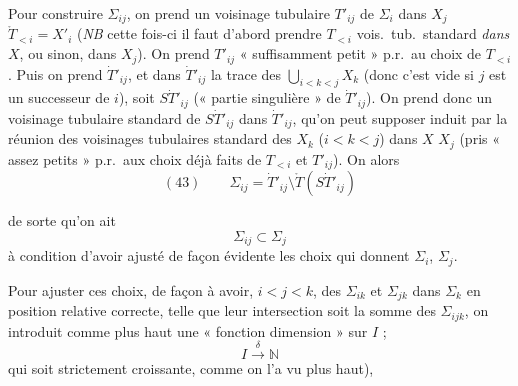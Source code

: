 \documentclass[11pt,a4paper]{article}
\begin{document}
Pour construire $\Sigma_{ij}$, on prend un voisinage tubulaire $T'_{ij}$ de $\Sigma_i$ dans $X_j$ \ill{} $\mathring T_{<i}=X'_i$ (\emph{NB} cette fois-ci il faut  d'abord prendre $T_{<i}$ vois.\ tub.\ standard \emph{dans} $X$, ou sinon, dans $X_j$). On prend $T'_{ij}$ « suffisamment petit » p.r.\ au choix de $T_{<i}$. Puis on prend $\dot T'_{ij}$, et dans $\dot T'_{ij}$ la trace des $\bigcup_{i<k<j}X_k$ (donc c'est vide si $j$ est un successeur de $i$), soit $S\dot T'_{ij}$ (« partie singulière » de $\dot T'_{ij}$). On prend donc un voisinage tubulaire standard   de $S\dot T'_{ij}$ dans $\dot T'_{ij}$, qu'on peut supposer induit par la réunion  des voisinages tubulaires standard des $X_k$ ($i<k<j$) dans $X$ \ill{} $X_j$ (pris « assez petits » p.r.\ aux choix déjà faits de $T_{<i}$ et $T'_{ij}$). On   alors
\[
(43)\qquad \Sigma_{ij}=\dot T'_{ij}\setminus\mathring T(S\dot T'_{ij})
\]


de sorte qu'on ait
\[
\Sigma_{ij}\subset\Sigma_j
\]
à condition d'avoir ajusté de façon évidente les choix qui donnent $\Sigma_i$, $\Sigma_j$.


Pour ajuster ces choix, de façon à avoir,  $i<j<k$, des $\Sigma_{ik}$ et $\Sigma_{jk}$ dans $\Sigma_k$ en  position relative correcte, telle que leur intersection soit la somme des $\Sigma_{ijk}$, on introduit comme plus haut une « fonction dimension » sur $I$ ;  
\[
I\xrightarrow{\ \delta\ }\mathbb N
\]
qui soit strictement croissante,  \add{\ill{}} comme on l'a vu plus haut), 

\end{document}
